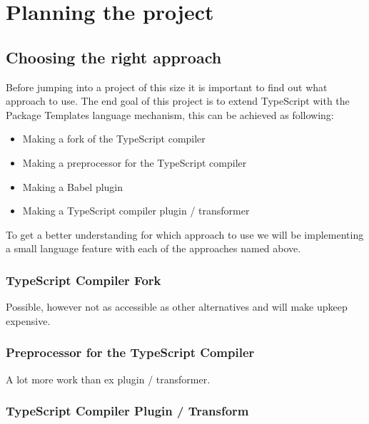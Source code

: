 
\chapter{Planning the project}\label{ch:planning-the-project}

\section{Choosing the right approach}\label{sec:choosing-the-right-approach}

Before jumping into a project of this size it is important to find out what approach to use.
The end goal of this project is to extend TypeScript with the Package Templates language mechanism,
this can be achieved as following:

\begin{itemize}
    \item Making a fork of the TypeScript compiler
    \item Making a preprocessor for the TypeScript compiler
    \item Making a Babel plugin
    \item Making a TypeScript compiler plugin / transformer
\end{itemize}

To get a better understanding for which approach to use we will be implementing a small language feature with each of the approaches named above.

\subsection{TypeScript Compiler Fork}\label{subsec:typescript-compiler-fork}

Possible, however not as accessible as other alternatives and will make upkeep expensive.

\subsection{Preprocessor for the TypeScript Compiler}\label{subsec:preprocessor-for-the-typescript-compiler}

A lot more work than ex plugin / transformer.

\subsection{TypeScript Compiler Plugin / Transform}\label{subsec:typescript-compiler-plugin}

